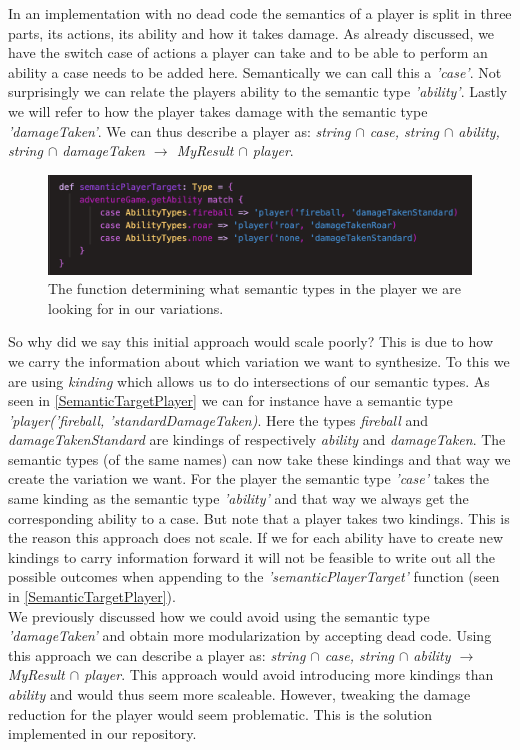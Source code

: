 In an implementation with no dead code the semantics of a player is split in three parts, its actions, its ability and how it takes damage. As already discussed, we have the switch case of actions a player can take and to be able to perform an ability a case needs to be added here. Semantically we can call this a \textit{'case'}. Not surprisingly we can relate the players ability to the semantic type \textit{'ability'}. Lastly we will refer to how the player takes damage with the semantic type \textit{'damageTaken'}. We can thus describe a player as: \textit{string $\cap$ case, string $\cap$ ability, string $\cap$ damageTaken $\to$ MyResult $\cap$ player}.

\begin{figure}[H]
	\centering
	\includegraphics[width=0.9\linewidth]{Materials/Decomposition/SemanticTargetPlayer}
	\caption{The function determining what semantic types in the player we are looking for in our variations.}
	\label{SemanticTargetPlayer}
\end{figure}
So why did we say this initial approach would scale poorly? This is due to how we carry the information about which variation we want to synthesize. To this we are using \textit{kinding} which allows us to do intersections of our semantic types. As seen in \autoref{SemanticTargetPlayer} we can for instance have a semantic type \textit{'player('fireball, 'standardDamageTaken)}. Here the types \textit{fireball} and \textit{damageTakenStandard} are kindings of respectively \textit{ability} and \textit{damageTaken}. The semantic types (of the same names) can now take these kindings and that way we create the variation we want. For the player the semantic type \textit{'case'} takes the same kinding as the semantic type \textit{'ability'} and that way we always get the corresponding ability to a case. But note that a player takes two kindings. This is the reason this approach does not scale. If we for each ability have to create new kindings to carry information forward it will not be feasible to write out all the possible outcomes when appending to the \textit{'semanticPlayerTarget'} function (seen in \autoref{SemanticTargetPlayer}).\\
We previously discussed how we could avoid using the semantic type \textit{'damageTaken'} and obtain more modularization by accepting dead code. Using this approach we can describe a player as: \textit{string $\cap$ case, string $\cap$ ability $\to$ MyResult $\cap$ player}. This approach would avoid introducing more kindings than \textit{ability} and would thus seem more scaleable. However, tweaking the damage reduction for the player would seem problematic. This is the solution implemented in our repository.\\
